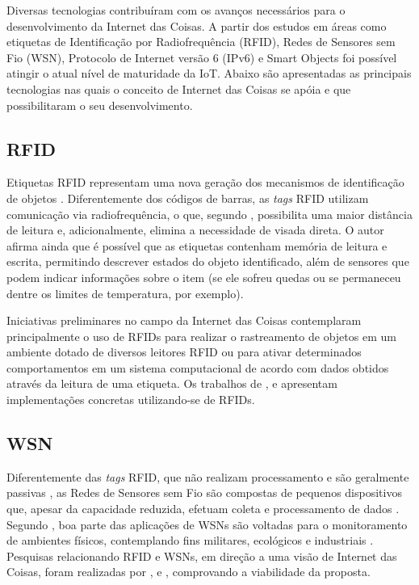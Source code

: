 \documentclass[twoside,english,brazilian]{UNISINOSmonografia}
\begin{document}
	Diversas tecnologias contribuíram com os avanços necessários para o 
	desenvolvimento da Internet das Coisas. A partir dos estudos em áreas como 
	etiquetas de Identificação por Radiofrequência (RFID), Redes de 
	Sensores sem Fio (WSN), Protocolo de Internet versão 6 (IPv6) e Smart 
	Objects foi possível atingir o atual nível de maturidade da IoT.
	Abaixo são apresentadas as principais tecnologias nas quais o conceito de 
	Internet das Coisas se apóia e que possibilitaram o seu desenvolvimento.



\subsection{RFID}
	Etiquetas RFID representam uma nova geração dos mecanismos de 
	identificação de objetos \cite{Brock2001}. Diferentemente dos códigos de 
	barras, as \textit{tags} RFID utilizam comunicação via radiofrequência, o 
	que, segundo , possibilita uma maior distância de 
	leitura e, adicionalmente, elimina a necessidade de visada direta. O autor 
	afirma ainda que é possível que as etiquetas contenham memória de leitura 
	e escrita, permitindo descrever estados do objeto identificado, além de 
	sensores que podem indicar informações sobre o item (se ele sofreu quedas 
	ou se permaneceu dentre os limites de temperatura, por exemplo).
	
	Iniciativas preliminares no campo da Internet das Coisas contemplaram 
	principalmente o uso de RFIDs para realizar o rastreamento de objetos em 
	um ambiente dotado de diversos leitores RFID ou para ativar determinados 
	comportamentos em um sistema computacional de acordo com dados obtidos 
	através da leitura de uma etiqueta. Os trabalhos de , 
	 e  apresentam 
	implementações concretas utilizando-se de RFIDs.

\subsection{WSN}
	Diferentemente das \textit{tags} RFID, que não realizam processamento e 
	são geralmente passivas \cite{Atzori2010b}, as Redes de Sensores sem Fio 
	são compostas de pequenos dispositivos que, apesar da capacidade reduzida, 
	efetuam coleta e processamento de dados \cite{Sakthidharan2012}. Segundo 
	, boa parte das aplicações de WSNs são voltadas para 
	o monitoramento de ambientes físicos, contemplando fins militares, 
	ecológicos e industriais \cite{Suhonen2012}. Pesquisas relacionando RFID e 
	WSNs, em direção a uma visão de Internet das Coisas, foram realizadas por 
	,  e , 
	comprovando a viabilidade da proposta.
	
\end{document}
